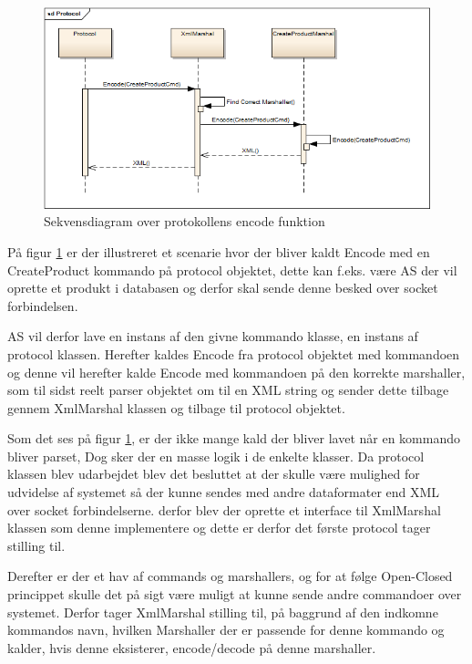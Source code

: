 \begin{figure}[H]
    \centering
    \includegraphics[width=1.0\textwidth]{Systemdesign/SharedLib/Images/Protokol/Protocol_Sek.png}
    \caption{Sekvensdiagram over protokollens encode funktion}
    \label{fig:protocolSek}
\end{figure}

På figur \ref{fig:protocolSek} er der illustreret et scenarie hvor der bliver kaldt Encode med en CreateProduct kommando på protocol objektet, dette kan f.eks. være \gls{AS} der vil oprette et produkt i databasen og derfor skal sende denne besked over socket forbindelsen.

\gls{AS} vil derfor lave en instans af den givne kommando klasse, en instans af protocol klassen. Herefter kaldes Encode fra protocol objektet med kommandoen og denne vil herefter kalde Encode med kommandoen på den korrekte marshaller, som til sidst reelt parser objektet om til en XML string og sender dette tilbage gennem XmlMarshal klassen og tilbage til protocol objektet. 

Som det ses på figur \ref{fig:protocolSek}, er der ikke mange kald der bliver lavet når en kommando bliver parset, Dog sker der en masse logik i de enkelte klasser. Da protocol klassen blev udarbejdet blev det besluttet at der skulle være mulighed for udvidelse af systemet så der kunne sendes med andre dataformater end XML over socket forbindelserne. derfor blev der oprette et interface til XmlMarshal klassen som denne implementere og dette er derfor det første protocol tager stilling til.

Derefter er der et hav af commands og marshallers, og for at følge Open-Closed princippet skulle det på sigt være muligt at kunne sende andre commandoer over systemet. Derfor tager XmlMarshal stilling til, på baggrund af den indkomne kommandos navn, hvilken Marshaller der er passende for denne kommando og kalder, hvis denne eksisterer, encode/decode på denne marshaller.